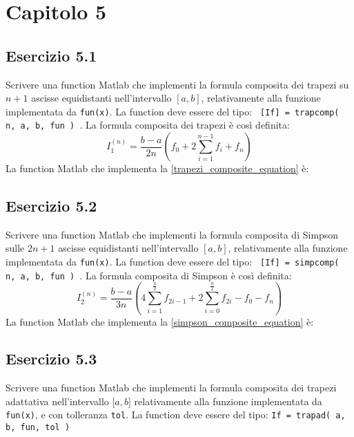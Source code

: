 \section{Capitolo 5}



	\subsection{Esercizio 5.1}
Scrivere una function Matlab che implementi la formula composita dei trapezi su $n+1$ ascisse equidistanti nell'intervallo $[a, b]$, relativamente alla funzione implementata da \texttt{fun(x)}. 
La function deve essere del tipo: \texttt{ [If] = trapcomp( n, a, b, fun ) }.
La formula composita dei trapezi è così definita:
\begin{equation}\label{trapezi_composite_equation}
	I_1^{(n)} = \frac{b-a}{2n} (f_0 + 2\sum_{i=1}^{n-1}f_i + f_n)
\end{equation}
La function Matlab che implementa la \ref{trapezi_composite_equation} è:




	\subsection{Esercizio 5.2}
Scrivere una function Matlab che implementi la formula composita di Simpson sulle $2n+1$ ascisse equidistanti nell'intervallo $[a, b]$, relativamente alla funzione implementata da \texttt{fun(x)}. 
La function deve essere del tipo: \texttt{ [If] = simpcomp( n, a, b, fun ) }.
La formula composita di Simpson è così definita:
\begin{equation}\label{simpson_composite_equation}
	I_2^{(n)} = \frac{b-a}{3n} (4\sum_{i=1}^{\frac{n}{2}}f_{2i-1} +2\sum_{i=0}^{\frac{n}{2}}f_{2i} - f_0 - f_n)
\end{equation}
La function Matlab che implementa la \ref{simpson_composite_equation} è:




	\subsection{Esercizio 5.3}
	Scrivere una function Matlab che implementi la formula composita dei trapezi adattativa nell’intervallo $\lbrack a,b \rbrack$  relativamente alla funzione implementata da \lstinline{fun(x)}, e con tolleranza \lstinline{tol}. La function deve essere del tipo: \lstinline{If = trapad( a, b, fun, tol )}